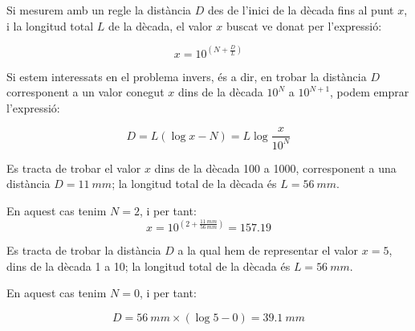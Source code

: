 Si mesurem amb un regle la dist\`{a}ncia $D$ des de l'inici de la d\`{e}cada fins al punt $x$, i
la longitud total $L$ de la d\`{e}cada, el valor $x$ buscat ve donat per l'expressi\'{o}:

\begin{equation}
    x = 10^{\left(N+\frac{D}{L}\right)}
\end{equation}

Si estem interessats en el problema invers, \'{e}s a dir, en  trobar la dist\`{a}ncia $D$
corresponent a un valor conegut $x$ dins de la d\`{e}cada $10^N$ a $10^{N+1}$, podem emprar
l'expressi\'{o}:

\begin{equation}
    D = L(\log x - N) = L \log\frac{x}{10^N}
\end{equation}

\begin{exemple}
    Es tracta de trobar el valor $x$ dins de la d\`{e}cada 100 a 1000, corresponent a una
    dist\`{a}ncia $D=\SI{11}{mm}$; la longitud total de la d\`{e}cada \'{e}s $L=\SI{56}{mm}$.

    En aquest cas tenim $N=2$, i per tant:
    \[
        x = 10^{\left(2+\frac{\SI{11}{mm}}{\SI{56}{mm}}\right)}= \num{157,19}
    \]
\end{exemple}

\begin{exemple}
    Es tracta de trobar la dist\`{a}ncia $D$ a la qual hem de representar el valor $x=5$, dins de la
    d\`{e}cada 1 a 10; la longitud total de la d\`{e}cada \'{e}s $L=\SI{56}{mm}$.

    En aquest cas tenim $N=0$, i per tant:

    \[
        D = \SI{56}{mm} \times (\log 5 - 0)  = \SI{39,1}{mm}
    \]
\end{exemple}

